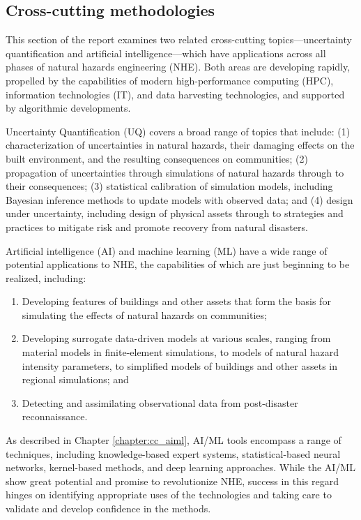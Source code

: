 
\begin{partbacktext}
\part{Cross-cutting methodologies}
\label{part:cross}

This section of the report examines two related cross-cutting topics---uncertainty quantification and artificial intelligence---which have applications across all phases of natural hazards engineering (NHE).  Both areas are developing rapidly, propelled by the capabilities of modern high-performance computing (HPC), information technologies (IT), and data harvesting technologies, and supported by algorithmic developments.  

Uncertainty Quantification (UQ) covers a broad range of topics that include: (1) characterization of uncertainties in natural hazards, their damaging effects on the built environment, and the resulting consequences on communities; (2) propagation of uncertainties through simulations of natural hazards through to their consequences; (3) statistical calibration of simulation models, including Bayesian inference methods to update models with observed data; and (4) design under uncertainty, including design of physical assets through to strategies and practices to mitigate risk and promote recovery from natural disasters.  

Artificial intelligence (AI) and machine learning (ML) have a wide range of potential applications to NHE, the capabilities of which are just beginning to be realized, including:

\begin{enumerate}
    \item Developing features of buildings and other assets that form the basis for simulating the effects of natural hazards on communities;
    \item Developing surrogate data-driven models at various scales, ranging from material models in finite-element simulations, to models of natural hazard intensity parameters, to simplified models of buildings and other assets in regional simulations; and
    \item Detecting and assimilating observational data from post-disaster reconnaissance.
\end{enumerate}

As described in Chapter \ref{chapter:cc_aiml}, AI/ML tools encompass a range of techniques, including knowledge-based expert systems, statistical-based neural networks, kernel-based methods, and deep learning approaches.
While the AI/ML show great potential and promise to revolutionize NHE, success in this regard hinges on identifying appropriate uses of the technologies and taking care to validate and develop confidence in the methods.


\end{partbacktext}